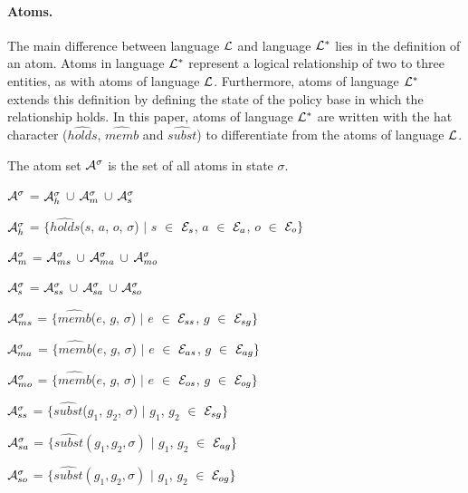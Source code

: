 \documentclass[global,twocolumn,final]{svjour}
\newenvironment{vquote}
  {\begin{list}{}{\leftmargin 1em}\item[]}
  {\end{list}}
\begin{document}
        \paragraph{Atoms.}

          The main difference between language ${\cal L}$ and language
          ${\cal L}^{*}$ lies in the definition of an atom. Atoms in language
          ${\cal L}^{*}$ represent a logical relationship of two to three
          entities, as with atoms of language ${\cal L}$. Furthermore, atoms of
          language ${\cal L}^{*}$ extends this definition by defining the
          state of the policy base in which the relationship holds. In this
          paper, atoms of language ${\cal L}^{*}$ are written with the
          hat character ($\hat{holds}$, $\hat{memb}$ and $\hat{subst}$) to
          differentiate from the atoms of language ${\cal L}$.

          The atom set ${\cal A}^{\sigma}$ is the set of all atoms in state
          $\sigma$.

          \begin{vquote}
            ${\cal A}^{\sigma}$ =
            ${\cal A}^{\sigma}_{h}$ $\cup$ ${\cal A}^{\sigma}_{m}$ $\cup$
            ${\cal A}^{\sigma}_{s}$

            ${\cal A}^{\sigma}_{h}$ =
            $\{\hat{holds}$($s$, $a$, $o$, $\sigma$) $\mid$ $s$ $\in$
            ${\cal E}_{s}$, $a$ $\in$ ${\cal E}_{a}$, $o$ $\in$
            ${\cal E}_{o}\}$

            ${\cal A}^{\sigma}_{m}$ =
            ${\cal A}^{\sigma}_{ms}$ $\cup$ ${\cal A}^{\sigma}_{ma}$ $\cup$
            ${\cal A}^{\sigma}_{mo}$

            ${\cal A}^{\sigma}_{s}$ =
            ${\cal A}^{\sigma}_{ss}$ $\cup$ ${\cal A}^{\sigma}_{sa}$ $\cup$
            ${\cal A}^{\sigma}_{so}$

            ${\cal A}^{\sigma}_{ms}$ =
            $\{\hat{memb}$($e$, $g$, $\sigma$) $\mid$ $e$ $\in$
            ${\cal E}_{ss}$, $g$ $\in$ ${\cal E}_{sg}\}$

            ${\cal A}^{\sigma}_{ma}$ =
            $\{\hat{memb}$($e$, $g$, $\sigma$) $\mid$ $e$ $\in$
            ${\cal E}_{as}$, $g$ $\in$ ${\cal E}_{ag}\}$

            ${\cal A}^{\sigma}_{mo}$ =
            $\{\hat{memb}$($e$, $g$, $\sigma$) $\mid$ $e$ $\in$
            ${\cal E}_{os}$, $g$ $\in$ ${\cal E}_{og}\}$

            ${\cal A}^{\sigma}_{ss}$ = $\{\hat{subst}$($g_{1}$, $g_{2}$,
            $\sigma$) $\mid$ $g_{1}$, $g_{2}$ $\in$ ${\cal E}_{sg}\}$

            ${\cal A}^{\sigma}_{sa}$ =
            $\{\hat{subst}(g_{1}, g_{2}, \sigma)$ $\mid$ $g_{1}$, $g_{2}$ $\in$
            ${\cal E}_{ag}\}$

            ${\cal A}^{\sigma}_{so}$ =
            $\{\hat{subst}(g_{1}, g_{2}, \sigma)$ $\mid$ $g_{1}$, $g_{2}$ $\in$
            ${\cal E}_{og}\}$
          \end{vquote}
\end{document}
